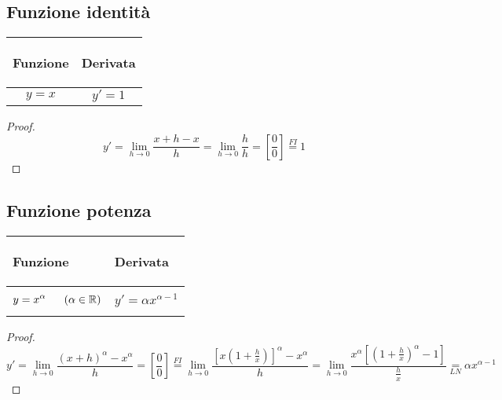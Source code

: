 \documentclass{book}     %
\begin{document}
\subsection{Funzione identità}
\begin{center}
    \begin{tabular}{m{}|m{}}
        \begin{center}
            \textbf{Funzione}
        \end{center}
        & 
        \begin{center}
            \textbf{Derivata}
        \end{center}\\
        \hline
            \[y=x\]&
            \[y'=1\]
    \end{tabular}
\end{center}
\begin{proof}
    \[y'=\lim_{h\to 0}\frac{x+h-x}{h}=\lim_{h\to 0}\frac{h}{h}=\left[\frac{0}{0}\right]\overset{FI}{=}1\]
\end{proof}

\subsection{Funzione potenza}
\begin{center}
    \begin{tabular}{m{}|m{}}
        \begin{center}
            \textbf{Funzione}
        \end{center}
        & 
        \begin{center}
            \textbf{Derivata}
        \end{center}\\
        \hline
            \[y=x^\alpha~~~~~(\alpha \in \mathbb{R})\]&
            \[y'=\alpha x ^{\alpha-1}\]
    \end{tabular}
\end{center}
\begin{proof}
    \[y'=\lim_{h\to 0}\frac{(x+h)^\alpha-x^\alpha}{h}=\left[ \frac{0}{0} \right]\overset{FI}{=}\lim_{h\to 0}\frac{\left[ x \left(1+\frac{h}{x}\right) \right]^\alpha -x^\alpha}{h}=\lim_{h\to 0}\frac{x^\alpha\left[\left(1+\frac{h}{x}\right)^\alpha -1\right] }{\frac{h}{x}}\underset{LN}=\alpha x^{\alpha-1}\]
\end{proof}
\end{document}
